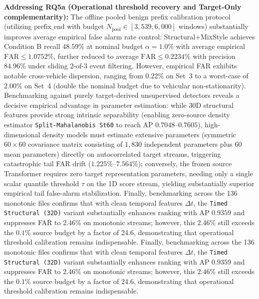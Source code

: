 \documentclass[12pt, a4paper, reqno, oneside]{book}
\DeclareRobustCommand{\code}[1]{\nolinkurl{#1}}
\begin{document}
\textbf{Addressing RQ5a (Operational threshold recovery and Target-Only complementarity):}
The offline pooled benign prefix calibration protocol (utilizing $\mathrm{prefix\_end}$ with budget $N_{\text{pool}} \in [3{,}539, 6{,}000]$ windows) substantially improves average empirical false alarm rate control: Structural+MixStyle achieves Condition B recall $48.59\%$ at nominal budget $\alpha=1.0\%$ with average empirical $\text{FAR} \le 1.0752\%$, further reduced to average $\text{FAR} \le 0.2234\%$ with precision $84.96\%$ under sliding $2\text{-of-}3$ event filtering. However, empirical FAR exhibits notable cross-vehicle dispersion, ranging from $0.22\%$ on Set~3 to a worst-case of $2.00\%$ on Set~4 (double the nominal budget due to vehicular non-stationarity). Benchmarking against purely target-derived unsupervised detectors reveals a decisive empirical advantage in parameter estimation: while 30D structural features provide strong intrinsic separability (enabling zero-source density estimator \code{Split-Mahalanobis St60} to reach AP $0.7048\text{--}0.7605$), high-dimensional density models must estimate extensive parameters (symmetric $60\times 60$ covariance matrix consisting of $1{,}830$ independent parameters plus $60$ mean parameters) directly on autocorrelated target streams, triggering catastrophic tail FAR drift ($1.225\%\text{--}7.564\%$); conversely, the frozen source Transformer requires zero target representation parameters, needing only a single scalar quantile threshold $\tau$ on the 1D score stream, yielding substantially superior empirical tail false-alarm stabilization. Finally, benchmarking across the 136 monotonic files confirms that with clean temporal features $\Delta t$, the \code{Timed Structural (32D)} variant substantially enhances ranking with AP $0.9359$ and suppresses FAR to $2.46\%$ on monotonic streams; however, this $2.46\%$ still exceeds the $0.1\%$ source budget by a factor of 24.6, demonstrating that operational threshold calibration remains indispensable. Finally, benchmarking across the 136 monotonic files confirms that with clean temporal features $\Delta t$, the \code{Timed Structural (32D)} variant substantially enhances ranking with AP $0.9359$ and suppresses FAR to $2.46\%$ on monotonic streams; however, this $2.46\%$ still exceeds the $0.1\%$ source budget by a factor of 24.6, demonstrating that operational threshold calibration remains indispensable.
\end{document}
